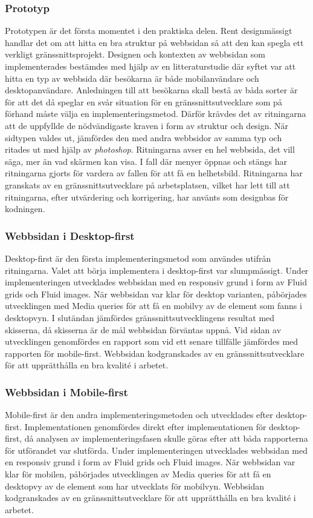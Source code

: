 \documentclass[11pt]{article}
\begin{document}
\subsubsection{Prototyp}
Prototypen är det första momentet i den praktiska delen. Rent designmässigt handlar det om att hitta en bra struktur på webbsidan så att den kan spegla ett verkligt gränssnittsprojekt. Designen och kontexten av webbsidan som implementerades bestämdes med hjälp av en litteraturstudie där syftet var att hitta en typ av webbsida där besökarna är både mobilanvändare och desktopanvändare. Anledningen till att besökarna skall bestå av båda sorter är för att det då speglar en svår situation för en gränssnittsutvecklare som på förhand måste välja en implementeringsmetod. Därför krävdes det av ritningarna att de uppfyllde de nödvändigaste kraven i form av struktur och design. När sidtypen valdes ut, jämfördes den med andra webbsidor av samma typ och ritades ut med hjälp av \textit{photoshop}. Ritningarna avser en hel webbsida, det vill säga, mer än vad skärmen kan visa. I fall där menyer öppnas och stängs har ritningarna gjorts för vardera av fallen för att få en helhetsbild. Ritningarna har granskats av en gränssnittsutvecklare på arbetsplatsen, vilket har lett till att ritningarna, efter utvärdering och korrigering, har använts som designbas för kodningen.
  
\subsubsection{Webbsidan i Desktop-first}
Desktop-first är den första implementeringsmetod som användes utifrån ritningarna. Valet att börja implementera i desktop-first var slumpmässigt. Under implementeringen utvecklades webbsidan med en responsiv grund i form av Fluid grids och Fluid images. När webbsidan var klar för desktop varianten, påbörjades utvecklingen med Media queries för att få en mobilvy av de element som fanns i desktopvyn. I slutändan jämfördes gränssnittsutvecklingens resultat med skisserna, då skisserna är de mål webbsidan förväntas uppnå. Vid sidan av utvecklingen genomfördes en rapport som vid ett senare tillfälle jämfördes med rapporten för mobile-first. Webbsidan kodgranskades av en gränssnittsutvecklare för att upprätthålla en bra kvalité i arbetet.

\subsubsection{Webbsidan i Mobile-first}
Mobile-first är den andra implementeringsmetoden och utvecklades efter desktop-first. Implementationen genomfördes direkt efter implementationen för desktop-first, då analysen av implementeringsfasen skulle göras efter att båda rapporterna för utförandet var slutförda. Under implementeringen utvecklades webbsidan med en responsiv grund i form av Fluid grids och Fluid images. När webbsidan var klar för mobilen, påbörjades utvecklingen av Media queries för att få en desktopvy av de element som har utvecklats för mobilvyn. Webbsidan kodgranskades av en gränssnittsutvecklare för att upprätthålla en bra kvalité i arbetet.
\end{document}
